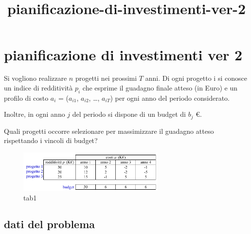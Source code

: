 \documentclass[11pt]{article}
\title{pianificazione-di-investimenti-ver-2}
\begin{document}
    
    \maketitle
    
    

    
    \hypertarget{pianificazione-di-investimenti-ver-2}{%
\section{pianificazione di investimenti ver
2}\label{pianificazione-di-investimenti-ver-2}}

Si vogliono realizzare \(n\) progetti nei prossimi \(T\) anni. Di ogni
progetto i si conosce un indice di redditività \(p_i\) che esprime il
guadagno finale atteso (in Euro) e un profilo di costo \(a_i\) =
(\(a_{i1}\), \(a_{i2}\), \ldots, \(a_{iT}\)) per ogni anno del periodo
considerato.

Inoltre, in ogni anno \(j\) del periodo si dispone di un budget di
\(b_j\) €.

Quali progetti occorre selezionare per massimizzare il guadagno atteso
rispettando i vincoli di budget?

\begin{figure}
\centering
\includegraphics[width=0.65\textwidth]{./tab1.png}
\caption{tab1}
\end{figure}

    \hypertarget{dati-del-problema}{%
\subsection{dati del problema}\label{dati-del-problema}}
\end{document}
